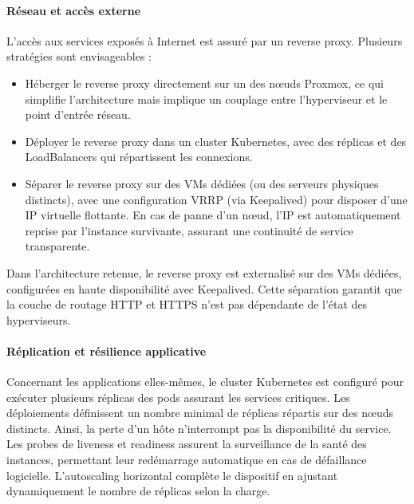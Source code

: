 \paragraph{Réseau et accès externe}
L’accès aux services exposés à Internet est assuré par un reverse proxy. Plusieurs stratégies sont envisageables :
\begin{itemize}
	\item Héberger le reverse proxy directement sur un des nœuds Proxmox, ce qui simplifie l’architecture mais implique un couplage entre l’hyperviseur et le point d’entrée réseau.
	\item Déployer le reverse proxy dans un cluster Kubernetes, avec des réplicas et des LoadBalancers qui répartissent les connexions.
	\item Séparer le reverse proxy sur des VMs dédiées (ou des serveurs physiques distincts), avec une configuration VRRP (via Keepalived) pour disposer d’une IP virtuelle flottante. En cas de panne d’un nœud, l’IP est automatiquement reprise par l’instance survivante, assurant une continuité de service transparente.
\end{itemize}
Dans l’architecture retenue, le reverse proxy est externalisé sur des VMs dédiées, configurées en haute disponibilité avec Keepalived. Cette séparation garantit que la couche de routage HTTP et HTTPS n’est pas dépendante de l’état des hyperviseurs.

\paragraph{Réplication et résilience applicative}
Concernant les applications elles-mêmes, le cluster Kubernetes est configuré pour exécuter plusieurs réplicas des pods assurant les services critiques. Les déploiements définissent un nombre minimal de réplicas répartis sur des nœuds distincts. Ainsi, la perte d’un hôte n’interrompt pas la disponibilité du service. Les probes de liveness et readiness assurent la surveillance de la santé des instances, permettant leur redémarrage automatique en cas de défaillance logicielle. L’autoscaling horizontal complète le dispositif en ajustant dynamiquement le nombre de réplicas selon la charge.

